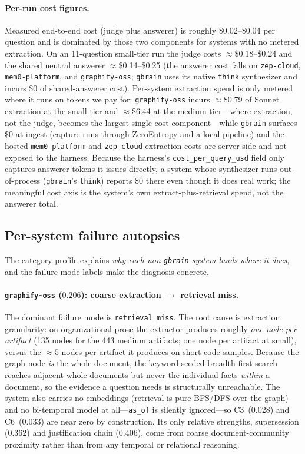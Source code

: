 \paragraph{Per-run cost figures.}
Measured end-to-end cost (judge plus answerer) is roughly \$0.02--\$0.04 per
question and is dominated by those two components for systems with no metered
extraction. On an 11-question small-tier run the judge costs $\approx$\$0.18--\$0.24
and the shared neutral answerer $\approx$\$0.14--\$0.25 (the answerer cost falls on
\texttt{zep-cloud}, \texttt{mem0-platform}, and \texttt{graphify-oss}; \texttt{gbrain}
uses its native \texttt{think} synthesizer and incurs \$0 of shared-answerer cost).
Per-system extraction spend is only metered where it runs on tokens we pay for:
\texttt{graphify-oss} incurs $\approx$\$0.79 of Sonnet extraction at the small tier
and $\approx$\$6.44 at the medium tier---where extraction, not the judge, becomes
the largest single cost component---while \texttt{gbrain} surfaces \$0 at ingest
(capture runs through ZeroEntropy and a local pipeline) and the hosted
\texttt{mem0-platform} and \texttt{zep-cloud} extraction costs are server-side and
not exposed to the harness. Because the harness's \texttt{cost\_per\_query\_usd}
field only captures answerer tokens it issues directly, a system whose synthesizer
runs out-of-process (\texttt{gbrain}'s \texttt{think}) reports \$0 there even though
it does real work; the meaningful cost axis is the system's own
extract-plus-retrieval spend, not the answerer total.

\subsection{Per-system failure autopsies}
\label{app:extended:autopsies}

The category profile explains \emph{why each non-\texttt{gbrain} system lands
where it does}, and the failure-mode labels make the diagnosis concrete.

\paragraph{\texttt{graphify-oss} ($0.206$): coarse extraction $\rightarrow$
retrieval miss.}
The dominant failure mode is \texttt{retrieval\_miss}. The root cause is
extraction granularity: on organizational prose the extractor produces roughly
\emph{one node per artifact} (135 nodes for the 443 medium artifacts; one node
per artifact at small), versus the $\approx 5$ nodes per artifact it produces on
short code samples. Because the graph node \emph{is} the whole document, the
keyword-seeded breadth-first search reaches adjacent whole documents but never
the individual facts \emph{within} a document, so the evidence a question needs
is structurally unreachable. The system also carries no embeddings (retrieval is
pure BFS/DFS over the graph) and no bi-temporal model at all---\texttt{as\_of} is
silently ignored---so C3~($0.028$) and C6~($0.033$) are near zero by
construction. Its only relative strengths, supersession ($0.362$) and
justification chain ($0.406$), come from coarse document-community proximity
rather than from any temporal or relational reasoning.


